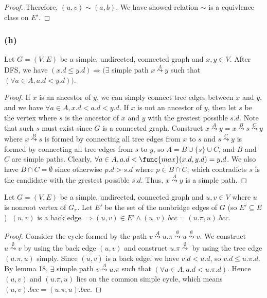 \begin{proof}
    Therefore, $(u,v) \sim (a,b)$.
    We have showed relation $\sim$ is a equivlence class on $E'$.
\end{proof}

\subsubsection*{(h)}

\begin{lemma}
    Let $G = (V,E)$ be a simple, undirected, connected graph
    and $x,y \in V$.
    After DFS, we have
    $(x.d \leq y.d) \Longrightarrow (\exists$ simple path
    $x \overset{A}{\leadsto} y$
    such that $(\forall a \in A, a.d < y.d))$.
\end{lemma}

\begin{proof}
    If $x$ is an ancestor of $y$,
    we can simply connect tree edges between $x$ and $y$,
    and we have $\forall a \in A, x.d < a.d < y.d$.
    If $x$ is not an ancestor of $y$,
    then let $s$ be the vertex where $s$ is the ancestor of $x$ and $y$
    with the grestest possible $s.d$.
    Note that such $s$ must exist since $G$ is a connected graph.
    Construct $x \overset{A}{\leadsto} y = 
    x \overset{B}{\leadsto} s \overset{C}{\leadsto} y$
    where $x \overset{B}{\leadsto} s$ is formed by connecting
    all tree edges from $x$ to $s$
    and $s \overset{C}{\leadsto} y$ is formed by connecting
    all tree edges from $s$ to $y$,
    so $A = B \cup \{ s \} \cup C$, and
    $B$ and $C$ are simple paths.
    Clearly, $\forall a \in A, a.d < \func{max}(x.d, y.d) = y.d$.
    We also have $B \cap C = \emptyset$
    since otherwise $p.d > s.d$ where $p \in B \cap C$,
    which contradicts $s$ is the candidate with the grestest possible $s.d$.
    Thus, $x \overset{A}{\leadsto} y$ is a simple path.
\end{proof}

\begin{lemma}
    Let $G = (V,E)$ be a simple, undirected, connected graph
    and $u,v \in V$ where $u$ is nonroot vertex of $G_\pi$.
    Let $E'$ be the set of the nonbridge edges of $G$ (so $E' \subseteq E$).
    $(u,v)$ is a back edge $\Longrightarrow 
    (u,v) \in E' \wedge (u,v).bcc = (u.\pi,u).bcc$.
\end{lemma}

\begin{proof}
    Consider the cycle formed by the path
    $v \overset{A}{\leadsto} u.\pi 
    \overset{\emptyset}{\leadsto} u 
    \overset{\emptyset}{\leadsto} v$.
    We construct $u \overset{\emptyset}{\leadsto} v$
    by using the back edge $(u,v)$
    and construct $u.\pi \overset{\emptyset}{\leadsto}$
    by using the tree edge $(u.\pi,u)$ simply.
    Since $(u,v)$ is a back edge,
    we have $v.d < u.d$,
    so $v.d \leq u.\pi.d$.
    By lemma 18, $\exists$ simple path
    $v \overset{A}{\leadsto} u.\pi$
    such that $(\forall a \in A, a.d < u.\pi.d)$.
    Hence $(u,v)$ and $(u.\pi,u)$ lies on the common simple cycle,
    which means $(u,v).bcc = (u.\pi,u).bcc$.
\end{proof}

